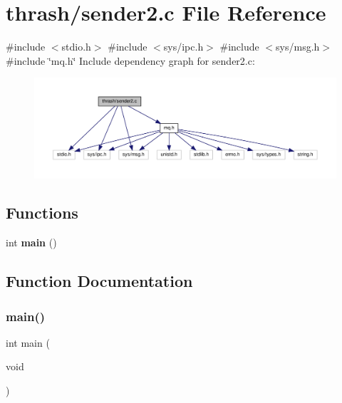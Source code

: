 \section{thrash/sender2.c File Reference}
\label{sender2_8c}
{\ttfamily \#include $<$stdio.\+h$>$}\newline
{\ttfamily \#include $<$sys/ipc.\+h$>$}\newline
{\ttfamily \#include $<$sys/msg.\+h$>$}\newline
{\ttfamily \#include \char`\"{}mq.\+h\char`\"{}}\newline
Include dependency graph for sender2.\+c\+:\nopagebreak
\begin{figure}[H]
\begin{center}
\leavevmode
\includegraphics[width=350pt]{sender2_8c__incl}
\end{center}
\end{figure}
\subsection*{Functions}
\begin{DoxyCompactItemize}
\item 
int \textbf{ main} ()
\end{DoxyCompactItemize}


\subsection{Function Documentation}
\mbox{\label{sender2_8c_ae66f6b31b5ad750f1fe042a706a4e3d4}} 
\subsubsection{main()}
{\footnotesize\ttfamily int main (\begin{DoxyParamCaption}\item[{void}]{ }\end{DoxyParamCaption})}

